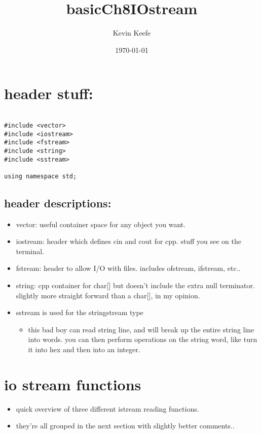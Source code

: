 \documentclass[11pt]{article}
\author{Kevin Keefe}
\date{\today}
\title{basicCh8IOstream}
\begin{document}
\maketitle
\tableofcontents


\section{header stuff:}
\label{sec:orgc2515d4}
\begin{verbatim}

#include <vector>
#include <iostream>
#include <fstream>
#include <string>
#include <sstream>

using namespace std;
\end{verbatim}
\subsection{header descriptions:}
\label{sec:org15c1a19}
\begin{itemize}
\item vector: useful container space for any object you want.
\item iostream: header which defines cin and cout for cpp. stuff you see on the terminal.
\item fstream: header to allow I/O with files. includes ofstream, ifstream, etc..
\item string: cpp container for char[] but doesn't include the extra null
terminator. slightly more straight forward than a char[], in my opinion.
\item sstream is used for the stringstream type
\begin{itemize}
\item this bad boy can read string line, and will break up the entire string line
into words. you can then perform operations on the string word, like turn it
into hex and then into an integer.
\end{itemize}
\end{itemize}

\section{io stream functions}
\label{sec:org7109e99}
\begin{itemize}
\item quick overview of three different istream reading functions.
\item they're all grouped in the next section with slightly better comments..
\end{itemize}
\end{document}
